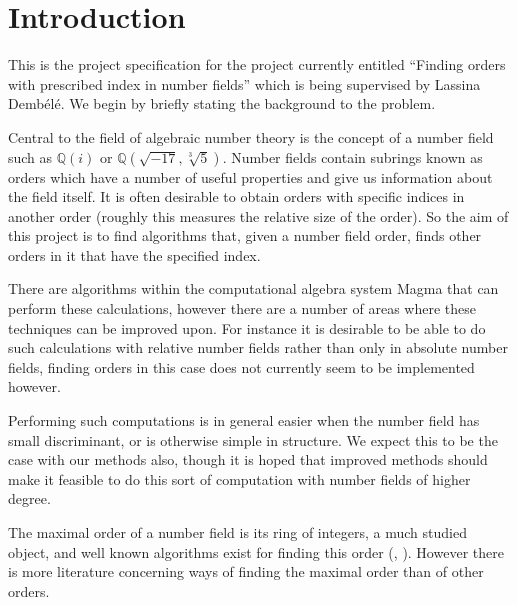 \documentclass[11pt,a4paper]{article}
\begin{document}
\maketitle
\section*{Introduction}
This is the project specification for the project currently entitled ``Finding 
orders with prescribed index in number fields'' which is being supervised by 
Lassina Demb\'el\'e. We begin by briefly stating the background to the problem.


Central to the field of algebraic number theory is the concept of a number 
field such as $\mathbb{Q}(i)$ or $\mathbb{Q}(\sqrt{-17},\sqrt[3]{5})$.
Number fields contain subrings known as orders which have a number of useful
properties and give us information about the field itself.
It is often desirable to obtain orders with specific indices in another order
(roughly this measures the relative size of the order).
So the aim of this project is to find algorithms that, given a number field
order, finds other orders in it that have the specified index.


There are algorithms within the computational algebra system Magma that can 
perform these calculations, however there are a number of areas where these 
techniques can be improved upon.
For instance it is desirable to be able to do such calculations with relative
number fields rather than only in absolute number fields, finding orders in
this case does not currently seem to be implemented however.


Performing such computations is in general easier when the number field has
small discriminant, or is otherwise simple in structure.
We expect this to be the case with our methods also, though it is hoped that
improved methods should make it feasible to do this sort of computation with
number fields of higher degree.


The maximal order of a number field is its ring of integers, a much studied 
object, and well known algorithms exist for finding this order 
(\cite{Poh-Zas89}, \cite{Coh93}).
However there is more literature concerning ways of finding the maximal 
order than of other orders.
\end{document}
